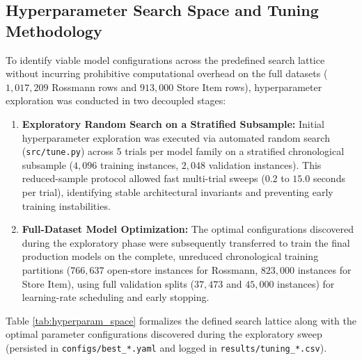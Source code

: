 \documentclass[11pt,a4paper]{article}
\begin{document}
\subsection{Hyperparameter Search Space and Tuning Methodology}
To identify viable model configurations across the predefined search lattice without incurring prohibitive computational overhead on the full datasets ($1,017,209$ Rossmann rows and $913,000$ Store Item rows), hyperparameter exploration was conducted in two decoupled stages:
\begin{enumerate}
    \item \textbf{Exploratory Random Search on a Stratified Subsample:} Initial hyperparameter exploration was executed via automated random search (\texttt{src/tune.py}) across 5 trials per model family on a stratified chronological subsample ($4,096$ training instances, $2,048$ validation instances). This reduced-sample protocol allowed fast multi-trial sweeps ($0.2$ to $15.0$ seconds per trial), identifying stable architectural invariants and preventing early training instabilities.
    \item \textbf{Full-Dataset Model Optimization:} The optimal configurations discovered during the exploratory phase were subsequently transferred to train the final production models on the complete, unreduced chronological training partitions ($766,637$ open-store instances for Rossmann, $823,000$ instances for Store Item), using full validation splits ($37,473$ and $45,000$ instances) for learning-rate scheduling and early stopping.
\end{enumerate}

Table \ref{tab:hyperparam_space} formalizes the defined search lattice along with the optimal parameter configurations discovered during the exploratory sweep (persisted in \texttt{configs/best\_*.yaml} and logged in \texttt{results/tuning\_*.csv}).
\end{document}
